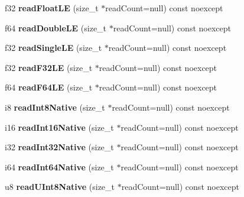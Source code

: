 \begin{DoxyCompactItemize}
f32 {\bfseries read\+Float\+LE} (size\+\_\+t $\ast$read\+Count=null) const noexcept
\item 
\mbox{\label{class_binary_reader_a33b7ad9ab81d5ec314f195587df42176}} 
f64 {\bfseries read\+Double\+LE} (size\+\_\+t $\ast$read\+Count=null) const noexcept
\item 
\mbox{\label{class_binary_reader_a58624dc06f10baa00efaecf6c239bdd1}} 
f32 {\bfseries read\+Single\+LE} (size\+\_\+t $\ast$read\+Count=null) const noexcept
\item 
\mbox{\label{class_binary_reader_a6dace339c4ae0641568cc119e1b7172e}} 
f32 {\bfseries read\+F32\+LE} (size\+\_\+t $\ast$read\+Count=null) const noexcept
\item 
\mbox{\label{class_binary_reader_a5df95f7a096354b6dcd0da2ac473d4f6}} 
f64 {\bfseries read\+F64\+LE} (size\+\_\+t $\ast$read\+Count=null) const noexcept
\item 
\mbox{\label{class_binary_reader_a5d9de40f8792cbb858ac776090a2d8d0}} 
i8 {\bfseries read\+Int8\+Native} (size\+\_\+t $\ast$read\+Count=null) const noexcept
\item 
\mbox{\label{class_binary_reader_a2764f4292150a44bd29722e68cdc2f9d}} 
i16 {\bfseries read\+Int16\+Native} (size\+\_\+t $\ast$read\+Count=null) const noexcept
\item 
\mbox{\label{class_binary_reader_a6a549547f8b0261a39035e5d50f666d6}} 
i32 {\bfseries read\+Int32\+Native} (size\+\_\+t $\ast$read\+Count=null) const noexcept
\item 
\mbox{\label{class_binary_reader_a51d0b1586cbfea97669941ecd0fcb753}} 
i64 {\bfseries read\+Int64\+Native} (size\+\_\+t $\ast$read\+Count=null) const noexcept
\item 
\mbox{\label{class_binary_reader_a00005fc773d9bbd2541a1769e3ead0fa}} 
u8 {\bfseries read\+U\+Int8\+Native} (size\+\_\+t $\ast$read\+Count=null) const noexcept
\item 
\mbox{\label{class_binary_reader_a722efb4d59e03fbc785d3281376edbfe}} 

\end{DoxyCompactItemize}
